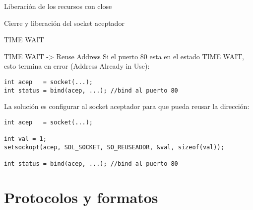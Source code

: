 \begin{frame}{Liberaci\'on de los recursos con close}
\end{frame}

\begin{frame}{Cierre y liberaci\'on del socket aceptador}
\end{frame}

\begin{frame}{TIME WAIT}
\end{frame}

\begin{frame}[fragile]{TIME WAIT -> Reuse Address}
Si el puerto 80 esta en el estado TIME WAIT, esto termina en error (Address Already in Use):
      \begin{lstlisting}[style=normal]
int acep   = socket(...);
int status = bind(acep, ...); //bind al puerto 80
      \end{lstlisting}
\pause
La soluci\'on es configurar al socket aceptador para que pueda reusar la direcci\'on:
      \begin{lstlisting}[style=normal]
int acep   = socket(...);

int val = 1;
setsockopt(acep, SOL_SOCKET, SO_REUSEADDR, &val, sizeof(val));

int status = bind(acep, ...); //bind al puerto 80
      \end{lstlisting}
\end{frame}

\section{Protocolos y formatos}
